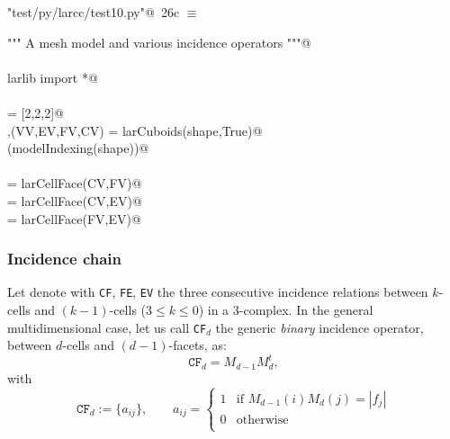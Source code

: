 \documentclass[11pt,oneside]{article}	%
\begin{document}
\begin{flushleft} \small \label{scrap43}
\protect{}\verb@"test/py/larcc/test10.py"@\nobreak\ {\footnotesize 26c }$\equiv$
\vspace{-1ex}
\begin{list}{}{} \item
\mbox{}\verb@""" A mesh model and various incidence operators """@\\
\mbox{}\verb@@\\
\mbox{}\verb@from larlib import *@\\
\mbox{}\verb@@\\
\mbox{}\verb@shape = [2,2,2]@\\
\mbox{}\verb@V,(VV,EV,FV,CV) = larCuboids(shape,True)@\\
\mbox{}\verb@VIEW(modelIndexing(shape))@\\
\mbox{}\verb@@\\
\mbox{}\verb@CF = larCellFace(CV,FV)@\\
\mbox{}\verb@CE = larCellFace(CV,EV)@\\
\mbox{}\verb@FE = larCellFace(FV,EV)@\\
\mbox{}\verb@@{\NWsep}
\end{list}
\vspace{-2ex}
\end{flushleft}

\subsubsection{Incidence chain}

Let denote with \texttt{CF}, \texttt{FE}, \texttt{EV} the three consecutive incidence relations between $k$-cells and $(k-1)$-cells ($3\leq k\leq 0$) in a 3-complex. In the general multidimensional case, let us call \texttt{CF}$_d$  the generic \emph{binary} incidence operator, between $d$-cells and $(d-1)$-facets, as:
\[
\texttt{CF}_d = M_{d-1} M_d^t, 
\]
with
\[
\texttt{CF}_d := \{a_{ij}\}, \qquad a_{ij} = 
\left\{
\begin{array}{cl}
1 & \mbox{if\ } M_{d-1}(i) M_d(j) = |f_j|  \\
0 & \mbox{otherwise}  \\  
\end{array}
\right.
\]
\end{document}

